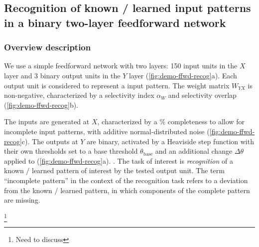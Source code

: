 \subsection{Recognition of known / learned input patterns in a binary two-layer feedforward network}

\subsubsection*{Overview description}

We use a simple feedforward network with two layers:
        150 input units in the $X$ layer
        and 3 binary output units in the $Y$ layer (\autoref{fig:demo-ffwd-recog}a).
    Each output unit is considered to represent a input pattern.
    The weight matrix $W_{YX}$ is non-negative, characterized by
        a selectivity index $\alpha_W$
        and selectivity overlap (\autoref{fig:demo-ffwd-recog}b).

The inputs are generated at $X$, characterized by
        a \% completeness to allow for incomplete input patterns,
        with additive normal-distributed noise (\autoref{fig:demo-ffwd-recog}c).
    The outputs at $Y$ are binary,
        activated by a Heaviside step function with
            their own thresholds set to a base threshold $\theta_{\mathrm{base}}$
            and an additional change $\Delta \theta$ applied to
            (\autoref{fig:demo-ffwd-recog}a).
    .
    The task of interest is \textit{recognition} of a known / learned pattern of interest by the tested output unit.
    The term ``incomplete pattern'' in the context of the recognition task refers to a deviation from the known / learned pattern,
        in which components of the complete pattern are missing.

 
        \footnote{Need to discuss}


